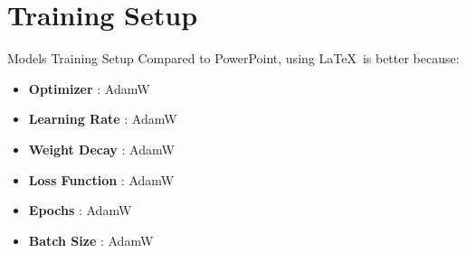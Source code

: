 \section{Training Setup}
\begin{frame}{Models Training Setup}
    Compared to PowerPoint, using \LaTeX\ is better because:
    \begin{itemize}
    \item \textbf{Optimizer} : AdamW
    \item \textbf{Learning Rate} : AdamW
    \item \textbf{Weight Decay} : AdamW
    \item \textbf{Loss Function} : AdamW
    \item \textbf{Epochs} : AdamW
    \item \textbf{Batch Size} : AdamW
    \end{itemize}
\end{frame}